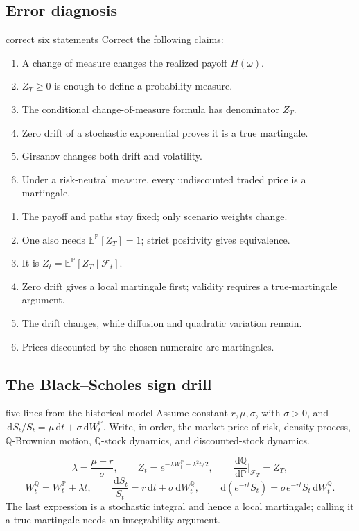 \documentclass[10pt]{article}
\newcommand{\E}{\mathbb E}
\newcommand{\Pp}{\mathbb P}
\newcommand{\Q}{\mathbb Q}
\newcommand{\1}{\mathbf 1}
\newcommand{\cF}{\mathcal F}
\newcommand{\dd}{\,\mathrm d}
\theoremstyle{definition}
\begin{document}
\subsection{Error diagnosis}

\begin{studentexercise}{correct six statements}
Correct the following claims:
\begin{enumerate}
  \item A change of measure changes the realized payoff \(H(\omega)\).
  \item \(Z_T\geq0\) is enough to define a probability measure.
  \item The conditional change-of-measure formula has denominator \(Z_T\).
  \item Zero drift of a stochastic exponential proves it is a true martingale.
  \item Girsanov changes both drift and volatility.
  \item Under a risk-neutral measure, every undiscounted traded price is a
        martingale.
\end{enumerate}
\end{studentexercise}
\begin{shortsolution}
\begin{enumerate}
  \item The payoff and paths stay fixed; only scenario weights change.
  \item One also needs \(\E^{\Pp}[Z_T]=1\); strict positivity gives
        equivalence.
  \item It is \(Z_t=\E^{\Pp}[Z_T\mid\cF_t]\).
  \item Zero drift gives a local martingale first; validity requires a
        true-martingale argument.
  \item The drift changes, while diffusion and quadratic variation remain.
  \item Prices discounted by the chosen numeraire are martingales.
\end{enumerate}
\end{shortsolution}

\subsection{The Black--Scholes sign drill}

\begin{studentexercise}{five lines from the historical model}
Assume constant \(r,\mu,\sigma\), with \(\sigma>0\), and
\(\dd S_t/S_t=\mu\dd t+\sigma\dd W_t^{\Pp}\). Write, in order, the
market price of risk, density process, \(\Q\)-Brownian motion,
\(\Q\)-stock dynamics, and discounted-stock dynamics.
\end{studentexercise}
\begin{shortsolution}
\[
\lambda=\frac{\mu-r}{\sigma},\qquad
Z_t=e^{-\lambda W_t^{\Pp}-\lambda^2t/2},\qquad
\frac{\dd\Q}{\dd\Pp}\bigg|_{\cF_T}=Z_T,
\]
\[
W_t^{\Q}=W_t^{\Pp}+\lambda t,\qquad
\frac{\dd S_t}{S_t}=r\dd t+\sigma\dd W_t^{\Q},\qquad
\boxed{\dd(e^{-rt}S_t)=\sigma e^{-rt}S_t\dd W_t^{\Q}.}
\]
The last expression is a stochastic integral and hence a local martingale;
calling it a true martingale needs an integrability argument.
\end{shortsolution}
\end{document}
